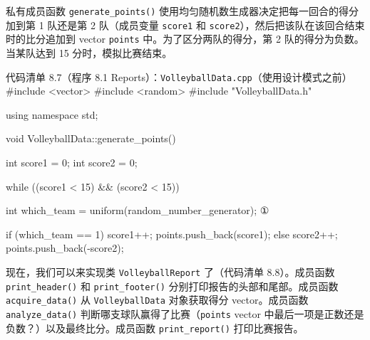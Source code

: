 私有成员函数 \texttt{generate\_\allowbreak{}points(\allowbreak{})\allowbreak{}} 使用均匀随机数生成器决定把每一回合的得分加到第 1 队还是第 2 队（成员变量 \texttt{score1} 和 \texttt{score2}），然后把该队在该回合结束时的比分追加到 vector \texttt{points} 中。为了区分两队的得分，第 2 队的得分为负数。当某队达到 15 分时，模拟比赛结束。

\begin{codeboxt}{代码清单 8.7（程序 8.1 Reports）：\texttt{Volleyball\allowbreak{}Data.\allowbreak{}cpp}（使用设计模式之前）}
#include <vector>
#include <random>
#include "VolleyballData.h"

using namespace std;

void VolleyballData::generate_points()
{
    int score1 = 0;
    int score2 = 0;

    while ((score1 < 15) && (score2 < 15))
    {
        int which_team = uniform(random_number_generator);  ①

        if (which_team == 1)
        {
            score1++;
            points.push_back(score1);
        }
        else
        {
            score2++;
            points.push_back(-score2);
        }
    }
}
\end{codeboxt}
\par

现在，我们可以来实现类 \texttt{Volleyball\allowbreak{}Report} 了（代码清单 8.8）。成员函数 \texttt{print\_\allowbreak{}header(\allowbreak{})\allowbreak{}} 和 \texttt{print\_\allowbreak{}footer(\allowbreak{})\allowbreak{}} 分别打印报告的头部和尾部。成员函数 \texttt{acquire\_\allowbreak{}data(\allowbreak{})\allowbreak{}} 从 \texttt{Volleyball\allowbreak{}Data} 对象获取得分 vector。成员函数 \texttt{analyze\_\allowbreak{}data(\allowbreak{})\allowbreak{}} 判断哪支球队赢得了比赛（\texttt{points} vector 中最后一项是正数还是负数？）以及最终比分。成员函数 \texttt{print\_\allowbreak{}report(\allowbreak{})\allowbreak{}} 打印比赛报告。

